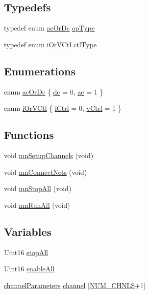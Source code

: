 \subsection*{Typedefs}
\begin{DoxyCompactItemize}
\item 
typedef enum \hyperlink{a00021_a067edf486f2115dfa74e51ce43cfdfa6}{ac\-Or\-Dc} \hyperlink{a00021_acd90d47e6937efc4183ab0d18f787575}{op\-Type}
\item 
typedef enum \hyperlink{a00021_a717a050513c9f1668fa40e08c4d5e78f}{i\-Or\-V\-Ctl} \hyperlink{a00021_a5cd368998e9721e657fd7bc6d413807a}{ctl\-Type}
\end{DoxyCompactItemize}
\subsection*{Enumerations}
\begin{DoxyCompactItemize}
\item 
enum \hyperlink{a00021_a067edf486f2115dfa74e51ce43cfdfa6}{ac\-Or\-Dc} \{ \hyperlink{a00021_a067edf486f2115dfa74e51ce43cfdfa6a22e2e72997ac4289587cadae38cc561e}{dc} = 0, 
\hyperlink{a00021_a067edf486f2115dfa74e51ce43cfdfa6ae13614f9b874b4bbeb45317b280ae5f0}{ac} = 1
 \}
\item 
enum \hyperlink{a00021_a717a050513c9f1668fa40e08c4d5e78f}{i\-Or\-V\-Ctl} \{ \hyperlink{a00021_a717a050513c9f1668fa40e08c4d5e78fad6554a2c0fc85e1b2dd381d6802c9052}{i\-Ctrl} = 0, 
\hyperlink{a00021_a717a050513c9f1668fa40e08c4d5e78fa0ea2edd69d870d99d3d8c102cd058383}{v\-Ctrl} = 1
 \}
\end{DoxyCompactItemize}
\subsection*{Functions}
\begin{DoxyCompactItemize}
\item 
void \hyperlink{a00021_ab787ed8809b8f3c22f698937c4f06fd7}{mn\-Setup\-Channels} (void)
\item 
void \hyperlink{a00021_a06d36d85b8d9d27cfc6674244ef1e603}{mn\-Connect\-Nets} (void)
\item 
void \hyperlink{a00021_ab9e9d895e2dd716625fbd464e944071c}{mn\-Stop\-All} (void)
\item 
void \hyperlink{a00021_a1e41564c4405fd553d1fed9cb2dbdda5}{mn\-Run\-All} (void)
\end{DoxyCompactItemize}
\subsection*{Variables}
\begin{DoxyCompactItemize}
\item 
Uint16 \hyperlink{a00021_ac9eb1cb01cb0229168d4277ac4c08295}{stop\-All}
\item 
Uint16 \hyperlink{a00021_a002da2ac651ab8bfc5755c0cd454a64f}{enable\-All}
\item 
\hyperlink{a00003}{channel\-Parameters} \hyperlink{a00021_a8d5dc394c7de43ab47a4f709a03331b9}{channel} \mbox{[}\hyperlink{a00031_afe433b138bb71d8d26b6e0907e656d1b}{N\-U\-M\-\_\-\-C\-H\-N\-L\-S}+1\mbox{]}
\end{DoxyCompactItemize}


